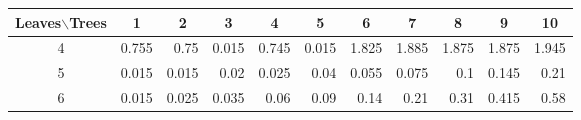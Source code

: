 \begin{tabular}{crrrrrrrrrr}
 \toprule
 Leaves$\backslash$Trees  & \multicolumn{1}{c}{1} & \multicolumn{1}{c}{2} & \multicolumn{1}{c}{3} & \multicolumn{1}{c}{4} & \multicolumn{1}{c}{5} & \multicolumn{1}{c}{6} & \multicolumn{1}{c}{7} & \multicolumn{1}{c}{8} & \multicolumn{1}{c}{9} & \multicolumn{1}{c}{10}\\
 \midrule
 4 & 0.755 & 0.75 & 0.015 & 0.745 & 0.015 & 1.825 & 1.885 & 1.875 & 1.875 & 1.945 \\ 
 5 & 0.015 & 0.015 & 0.02 & 0.025 & 0.04 & 0.055 & 0.075 & 0.1 & 0.145 & 0.21 \\ 
 6 & 0.015 & 0.025 & 0.035 & 0.06 & 0.09 & 0.14 & 0.21 & 0.31 & 0.415 & 0.58 \\ 
\bottomrule 
\end{tabular} 
